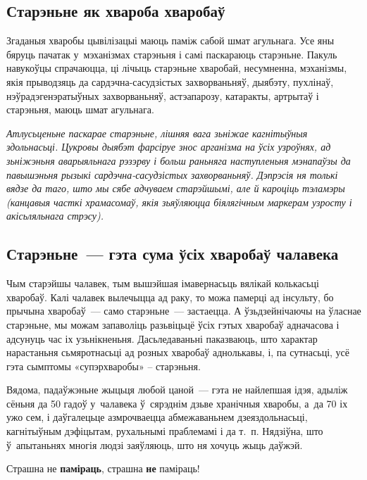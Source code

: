 \subsection*{Старэньне як хвароба хваробаў}

Згаданыя хваробы цывілізацыі маюць паміж сабой шмат агульнага. Усе яны бяруць пачатак у~мэханізмах старэньня і самі паскараюць старэньне. Пакуль навукоўцы спрачаюцца, ці лічыць старэньне хваробай, несумненна, мэханізмы, якія прыводзяць да сардэчна-сасудзістых захворваньняў, дыябэту, пухлінаў, нэўрадэгенэратыўных захворваньняў, астэапарозу, катаракты, артрытаў і старэньня, маюць шмат агульнага.

\emph{Атлусьценьне паскарае старэньне, лішняя вага зьніжае кагнітыўныя здольнасьці. Цукровы дыябэт фарсіруе знос арганізма на ўсіх узроўнях, ад зьніжэньня аварыяльнага рэзэрву і больш раньняга наступленьня мэнапаўзы да павышэньня рызыкі сардэчна-сасудзістых захворваньняў. Дэпрэсія ня толькі вядзе да таго, што мы сябе адчуваем старэйшымі, але й кароціць тэламэры (канцавыя часткі храмасомаў, якія зьяўляюцца біялягічным маркерам узросту і акісьляльнага стрэсу).}

\subsection*{Старэньне~--- гэта сума ўсіх хваробаў чалавека}

Чым старэйшы чалавек, тым вышэйшая імавернасьць вялікай колькасьці хваробаў. Калі чалавек вылечыцца ад раку, то можа памерці ад інсульту, бо прычына хваробаў~--- само старэньне~--- застаецца. А ўзьдзейнічаючы на ўласнае старэньне, мы можам запаволіць разьвіцьцё ўсіх гэтых хваробаў адначасова і адсунуць час іх узьнікненьня. Дасьледаваньні паказваюць, што характар нарастаньня сьмяротнасьці ад розных хваробаў аднолькавы, і, па сутнасьці, усё гэта сымптомы «супэрхваробы» -- старэньня. 


Вядома, падаўжэньне жыцьця любой цаной~--- гэта не найлепшая ідэя, адыліж сёньня да 50 гадоў у~чалавека ў~сярэднім дзьве хранічныя хваробы, а~да 70 іх ужо сем, і даўгалецьце азмрочваецца абмежаваньнем дзеяздольнасьці, кагнітыўным дэфіцытам, рухальнымі праблемамі і да т.~п. Нядзіўна, што ў~апытаньнях многія людзі заяўляюць, што ня хочуць жыць даўжэй. 

Страшна не \textbf{паміраць}, страшна \textbf{не} паміраць!

